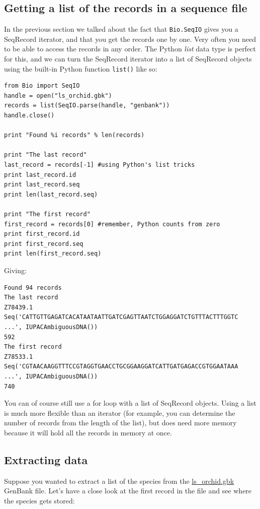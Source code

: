 \documentclass{report}
\begin{document}
\subsection{Getting a list of the records in a sequence file}

In the previous section we talked about the fact that \verb|Bio.SeqIO| gives you a SeqRecord iterator, and that you get the records one by one.  Very often you need to be able to access the records in any order. The Python {\it list} data type is perfect for this, and we can turn the SeqRecord iterator into a list of SeqRecord objects using the built-in Python function \verb|list()| like so:

\begin{verbatim}
from Bio import SeqIO
handle = open("ls_orchid.gbk")
records = list(SeqIO.parse(handle, "genbank"))
handle.close()

print "Found %i records" % len(records)

print "The last record"
last_record = records[-1] #using Python's list tricks
print last_record.id
print last_record.seq
print len(last_record.seq)

print "The first record"
first_record = records[0] #remember, Python counts from zero
print first_record.id
print first_record.seq
print len(first_record.seq)
\end{verbatim}

\noindent Giving:

\begin{verbatim}
Found 94 records
The last record
Z78439.1
Seq('CATTGTTGAGATCACATAATAATTGATCGAGTTAATCTGGAGGATCTGTTTACTTTGGTC ...', IUPACAmbiguousDNA())
592
The first record
Z78533.1
Seq('CGTAACAAGGTTTCCGTAGGTGAACCTGCGGAAGGATCATTGATGAGACCGTGGAATAAA ...', IUPACAmbiguousDNA())
740
\end{verbatim}

You can of course still use a for loop with a list of SeqRecord objects.  Using a list is much more flexible than an iterator (for example, you can determine the number of records from the length of the list), but does need more memory because it will hold all the records in memory at once.

\subsection{Extracting data}

Suppose you wanted to extract a list of the species from the \href{http://biopython.org/DIST/docs/tutorial/examples/ls_orchid.gbk}{ls\_orchid.gbk} GenBank file.  Let's have a close look at the first record in the file and see where the species gets stored:
\end{document}

